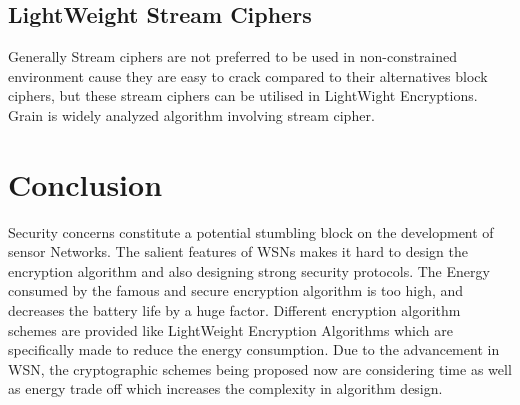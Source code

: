 \documentclass[conference]{IEEEtran}
\begin{document}
\subsection{LightWeight Stream Ciphers}
Generally Stream ciphers are not preferred to be used in non-constrained environment cause they are easy to crack compared to their alternatives block ciphers, but these stream ciphers can be utilised in LightWight Encryptions. Grain is widely analyzed algorithm involving stream cipher.

\section{Conclusion}
Security concerns constitute a potential stumbling block on the development of sensor Networks. The salient features of WSNs makes it hard to design the encryption algorithm and also designing strong security protocols. The Energy consumed by the famous and secure encryption algorithm is too high, and decreases the battery life by a huge factor. Different encryption algorithm schemes are provided like LightWeight Encryption Algorithms which are specifically made to reduce the energy consumption. Due to the advancement in WSN, the cryptographic schemes being proposed now are considering time as well as energy trade off which increases the complexity in algorithm design.


\ifCLASSOPTIONcaptionsoff
  \newpage
\fi
\end{document}
